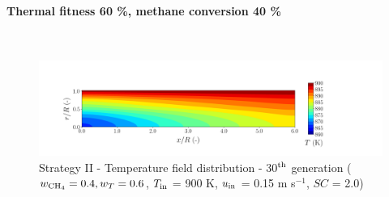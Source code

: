 \documentclass[preprint,12pt]{elsarticle}
\begin{document}



\clearpage



\paragraph{Thermal fitness 60 \%, methane conversion 40 \%} \hspace{0pt} \\
\noindent 

%

\begin{figure}[h!]
\centering
\includegraphics[width=190mm]{results/5Eq/40C_60T/GEN30-TFIELD.png}
\caption{\label{fig:5RES4060G30-TField} Strategy II - Temperature field distribution - 30$^{\rm{th}}$ generation ($w_{\rm{CH_4}} = 0.4, w_T = 0.6$, $T_{\rm{in}}$ = 900 K, $u_{\rm{in}}$ = 0.15 m s$^{-1}$, $SC$ = 2.0)}
\end{figure}
\end{document}
